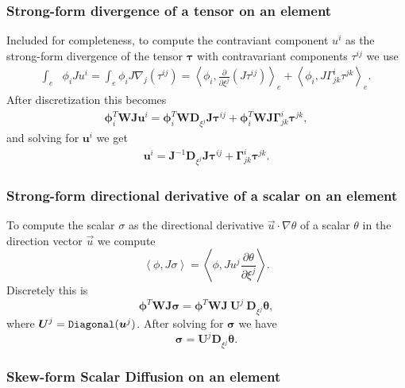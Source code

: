 \documentclass{report}
\newcommand{\inner}[2]{ \left\langle #1, #2 \right\rangle }
\newcommand{\mat}[1]{\boldsymbol #1}
\newcommand{\dvec}[1]{\boldsymbol #1}
\begin{document}
\subsubsection*{Strong-form divergence of a tensor on an element}
Included for completeness, to compute the contraviant component $u^{i}$ as
the strong-form divergence of the tensor $\mat{\tau}$  with contravariant
components $\tau^{ij}$ we use
\begin{align}
  \int_{e} &\phi_{i}J u^{i}
  =
  \int_{e} \phi_{i}J \nabla_{j}\left(\tau^{ij}\right)
  =
  \inner{
  \phi_{i}
  }{
  \frac{\partial}{\partial \xi^{j}}\left(
  J \tau^{ij}
  \right)
  }_{e}
  +
  \inner{\phi_{i}}{J \Gamma_{jk}^{i} \tau^{jk}}_{e}.
\end{align}
After discretization this becomes
\begin{align}
  \dvec{\phi}_{i}^{T} \mat{W} \mat{J} \dvec{u}^{i}
  =
  \dvec{\phi}_{i}^{T} \mat{W} \mat{D}_{\xi^j} \mat{J} \dvec{\tau}^{ij}
  +
  \dvec{\phi}_{i}^{T} \mat{W} \mat{J} \mat{\Gamma}^{i}_{jk} \dvec{\tau}^{jk},
\end{align}
and solving for $\dvec{u}^{i}$ we get
\begin{align}
  \dvec{u}^{i}
  =
  \mat{J}^{-1} \mat{D}_{\xi^j} \mat{J} \dvec{\tau}^{ij}
  +
  \mat{\Gamma}^{i}_{jk} \dvec{\tau}^{jk}.
\end{align}

\subsubsection*{Strong-form directional derivative of a scalar on an element}
To compute the scalar $\sigma$ as the directional derivative
$\vec{u} \cdot \nabla \theta$ of a scalar $\theta$ in the direction
vector $\vec{u}$ we compute
\begin{equation}
  \inner{\phi}{J \sigma} =
  \inner{\phi}{J u^j \frac{\partial\theta}{\partial \xi^j}}.
\end{equation}
Discretely this is
\begin{equation}
  \dvec{\phi}^{T} \mat{W} \mat{J} \dvec{\sigma}
  =
  \dvec{\phi}^{T} \mat{W} \mat{J}
  ~
  \mat{U}^j
  ~
  \mat{D}_{\xi^{j}} \dvec{\theta},
\end{equation}
where $\mat{U}^j = \text{\tt Diagonal}(\vec{u}^{j})$.
After solving for $\dvec{\sigma}$ we have
\begin{equation}
  \dvec{\sigma}
  =
  \mat{U}^j \mat{D}_{\xi^{j}} \dvec{\theta}.
\end{equation}

\subsubsection*{Skew-form Scalar Diffusion on an element}
\end{document}
